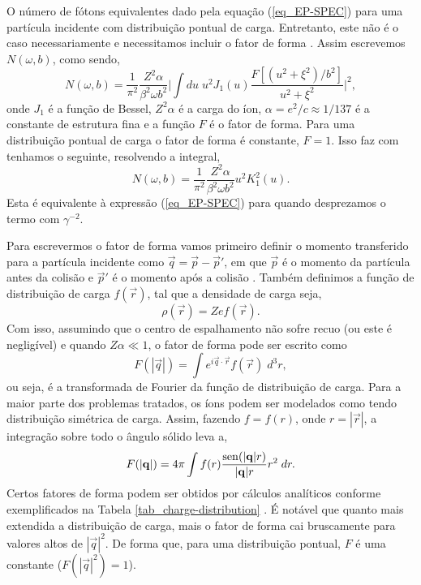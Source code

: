 O número de fótons equivalentes dado pela equação (\ref{eq_EP-SPEC}) 
para uma partícula incidente com distribuição pontual de carga. Entretanto,
este não é o caso necessariamente e necessitamos incluir o fator de forma
\cite{BERTULANI1988299} \cite{BAUR1991}. Assim escrevemos $N(\omega ,
b)$, como sendo,
\begin{equation}
	N(\omega , b) = \frac{1}{\pi ^2} \frac{Z^2 \alpha}{\beta ^2 \omega b^2}
	\bigg| \int du \; u^2 J_1 (u) \frac{F[(u^2 + \xi ^2)/b^2]}{u^2 + \xi ^2}
	\bigg|^2, \label{eq_EP-SPEC-F}
\end{equation}
onde $J_1$ é a função de Bessel, $Z^2 \alpha$ é a carga do íon, $\alpha = e^2
/c \approx 1/137$ é a constante de estrutura fina e a função $F$ é o fator de
forma. Para uma distribuição pontual de carga o fator de forma é constante,
$F = 1$. Isso faz com tenhamos o seguinte, resolvendo a integral,
\begin{equation}
	N(\omega , b) = \frac{1}{\pi ^2}\frac{Z^2 \alpha}{\beta ^2 \omega b^2} u^2
	K_1^2 (u).
\end{equation}
Esta é equivalente à expressão (\ref{eq_EP-SPEC}) para quando desprezamos o
termo com $\gamma ^{-2}$.

Para escrevermos o fator de forma vamos primeiro definir o momento transferido
para a partícula incidente como $\vec{q} = \vec{p} - \vec{p}'$, em que
$\vec{p}$ é o momento da partícula antes da colisão e $\vec{p}'$ é o momento
após a colisão \cite{povh6ed}. Também definimos a função de distribuição de carga $f(\vec{r})$,
tal que a densidade de carga seja,
\begin{equation}
	\rho (\vec{r}) = Ze f(\vec{r}).
\end{equation}
Com isso, assumindo que o centro de espalhamento não sofre recuo (ou este é
negligível) e quando $Z\alpha \ll 1$, o fator de forma pode ser escrito como
\begin{equation}
	F(|\vec{q}|) = \int e^{i\vec{q} \cdot \vec{r}} f(\vec{r}) \; d^3 r,
\end{equation}
ou seja, é a transformada de Fourier da função de distribuição de carga. Para a
maior parte dos problemas tratados, os íons podem ser modelados como tendo
distribuição simétrica de carga. Assim, fazendo $f = f(r)$, onde $r=|\vec{r}|$,
a integração sobre todo o ângulo sólido leva a,
\begin{equation}
	F(|\mathbf{q}|) = 4\pi \int f(r) \frac{\operatorname*{sen}(|\mathbf{q}|r)}{|\mathbf{q}|r}
	r^2 \; dr.
\end{equation}
Certos fatores de forma podem ser obtidos por cálculos analíticos conforme
exemplificados na Tabela \ref{tab_charge-distribution} \cite{povh6ed}. É
notável que quanto mais extendida a distribuição de carga, mais o fator de
forma cai bruscamente para valores altos de $|\vec{q}|^2$. De forma que, para
uma distribuição pontual, $F$ é uma constante ($F(|\vec{q}|^2) = 1$).

